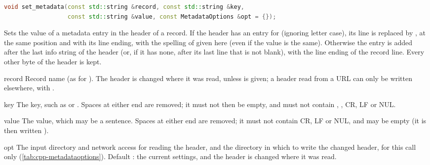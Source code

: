\begin{lstlisting}[language=C++,style=signature]
void set_metadata(const std::string &record, const std::string &key,
                  const std::string &value, const MetadataOptions &opt = {});
\end{lstlisting}
Sets the value of a metadata entry in the header of a record. If the header has an entry
for  (ignoring letter case), its line is replaced by , at
the same position and with its line ending, with the spelling of  given here
(even if the value is the same). Otherwise the entry is added after the last info string
of the header (or, if it has none, after its last line that is not blank), with the line
ending of the record line. Every other byte of the header is kept.
\begin{params}
\item[record] Record name (as for ). The header is changed where it
  was read, unless  is given; a header read from a URL can only be written
  elsewhere, with .
\item[key] The key, such as  or . Spaces at either end
  are removed; it must not then be empty, and must not contain \code{:}, \code{\#}, CR,
  LF or NUL.
\item[value] The value, which may be a sentence. Spaces at either end are removed; it
  must not contain CR, LF or NUL, and may be empty (it is then written ).
\item[opt] The input directory and network access for reading the header, and the
  directory  in which to write the changed header, for this call only
  (\cref{tab:cpp-metadataoptions}). Default \code{\{\}}: the current settings, and the
  header is changed where it was read.
\end{params}
